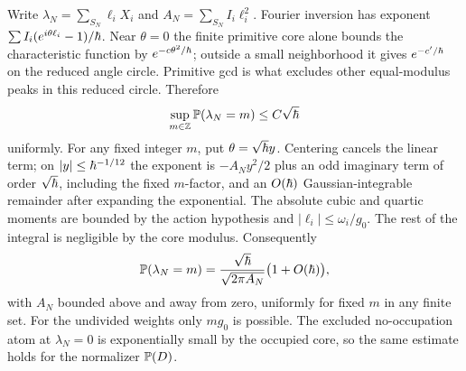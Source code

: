Write \(\lambda_N=\sum_{S_N}\ell_i X_i\) and \(A_N=\sum_{S_N}I_i\ell_i^2\). Fourier inversion has exponent \(\sum I_i(e^{i\theta\ell_i}-1)/\hbar\). Near \(\theta=0\) the finite primitive core alone bounds the characteristic function by \(e^{-c\theta^2/\hbar}\); outside a small neighborhood it gives \(e^{-c'/\hbar}\) on the reduced angle circle. Primitive gcd is what excludes other equal-modulus peaks in this reduced circle. Therefore
\[
     \sup_{m\in\mathbb Z}\mathbb P(\lambda_N=m)\leq C\sqrt{\hbar}
\]
uniformly. For any fixed integer \(m\), put \(\theta=\sqrt{\hbar}y\). Centering cancels the linear term; on \(|y|\leq\hbar^{-1/12}\) the exponent is \(-A_Ny^2/2\) plus an odd imaginary term of order \(\sqrt{\hbar}\), including the fixed \(m\)-factor, and an \(O(\hbar)\) Gaussian-integrable remainder after expanding the exponential. The absolute cubic and quartic moments are bounded by the action hypothesis and \(|\ell_i|\leq\omega_i/g_0\). The rest of the integral is negligible by the core modulus. Consequently
\begin{equation}\label{eq:localclt}
    \mathbb P(\lambda_N=m)
        =\frac{\sqrt{\hbar}}{\sqrt{2\pi A_N}}\bigl(1+O(\hbar)\bigr),
\end{equation}
with \(A_N\) bounded above and away from zero, uniformly for fixed \(m\) in any finite set. For the undivided weights only \(m g_0\) is possible. The excluded no-occupation atom at \(\lambda_N=0\) is exponentially small by the occupied core, so the same estimate holds for the normalizer \(\mathbb P(D)\).

